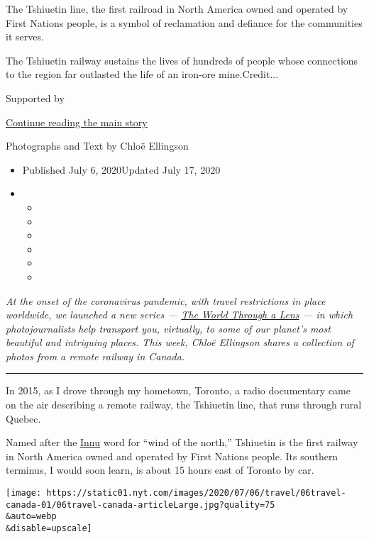 The Tshiuetin line, the first railroad in North America owned and
operated by First Nations people, is a symbol of reclamation and
defiance for the communities it serves.

The Tshiuetin railway sustains the lives of hundreds of people whose
connections to the region far outlasted the life of an iron-ore
mine.Credit...

Supported by

\protect\hyperlink{after-sponsor}{Continue reading the main story}

Photographs and Text by Chloë Ellingson

\begin{itemize}
\item
  Published July 6, 2020Updated July 17, 2020
\item
  \begin{itemize}
  \item
  \item
  \item
  \item
  \item
  \item
  \end{itemize}
\end{itemize}

\emph{At the onset of the coronavirus pandemic, with travel restrictions
in place worldwide, we launched a new series ---}
\href{https://www.nytimes.com/column/the-world-through-a-lens}{\emph{The
World Through a Lens}} \emph{--- in which photojournalists help
transport you, virtually, to some of our planet's most beautiful and
intriguing places. This week, Chloë Ellingson shares a collection of
photos from a remote railway in Canada.}

\begin{center}\rule{0.5\linewidth}{\linethickness}\end{center}

In 2015, as I drove through my hometown, Toronto, a radio documentary
came on the air describing a remote railway, the Tshiuetin line, that
runs through rural Quebec.

Named after the \href{https://www.innu.ca/}{Innu} word for ``wind of the
north,'' Tshiuetin is the first railway in North America owned and
operated by First Nations people. Its southern terminus, I would soon
learn, is about 15 hours east of Toronto by car.

\texttt{[image: https://static01.nyt.com/images/2020/07/06/travel/06travel-canada-01/06travel-canada-articleLarge.jpg?quality=75\\\&auto=webp\\\&disable=upscale]}


